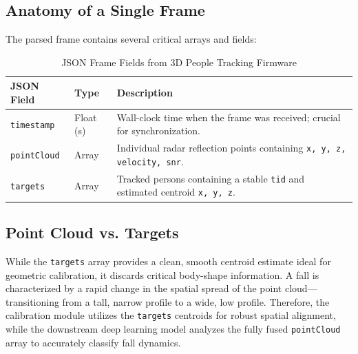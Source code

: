\subsection{Anatomy of a Single Frame}
The parsed frame contains several critical arrays and fields:
\begin{table}[H]
\centering
\caption{JSON Frame Fields from 3D People Tracking Firmware}
\label{tab:json_frame}
\begin{tabular}{|l|l|p{8cm}|}
\hline
\textbf{JSON Field} & \textbf{Type} & \textbf{Description} \\ \hline
\texttt{timestamp} & Float (s) & Wall-clock time when the frame was received; crucial for synchronization. \\ \hline
\texttt{pointCloud} & Array & Individual radar reflection points containing \texttt{x, y, z, velocity, snr}. \\ \hline
\texttt{targets} & Array & Tracked persons containing a stable \texttt{tid} and estimated centroid \texttt{x, y, z}. \\ \hline
\end{tabular}
\end{table}

\subsection{Point Cloud vs. Targets}
While the \texttt{targets} array provides a clean, smooth centroid estimate ideal for geometric calibration, it discards critical body-shape information. A fall is characterized by a rapid change in the spatial spread of the point cloud—transitioning from a tall, narrow profile to a wide, low profile. Therefore, the calibration module utilizes the \texttt{targets} centroids for robust spatial alignment, while the downstream deep learning model analyzes the fully fused \texttt{pointCloud} array to accurately classify fall dynamics.
